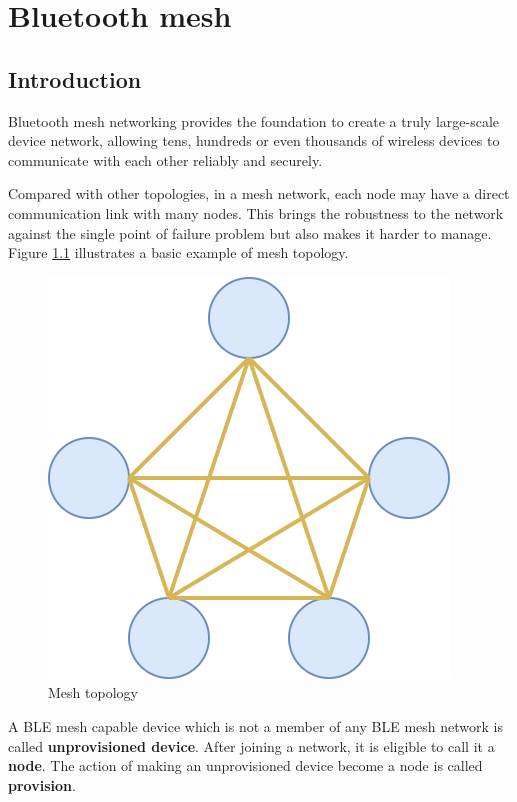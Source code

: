 \documentclass[../../main.tex]{subfiles}
\begin{document}
\graphicspath{{img/}{02_theory/img/}}

\chapter{Bluetooth mesh}

\section{Introduction}
Bluetooth mesh networking provides the foundation to create a truly large-scale device network, allowing tens, hundreds or even thousands of wireless devices to communicate with each other reliably and securely.

Compared with other topologies, in a mesh network, each node may have a direct communication link with many nodes. This brings the robustness to the network against the single point of failure problem but also makes it harder to manage. Figure \ref{fig:Mesh topology} illustrates a basic example of mesh topology.

\begin{figure}[ht]
    \begin{center}
        \includegraphics[scale=0.3]{mesh_topo.png}
    \end{center}
    \caption{Mesh topology}
    \label{fig:Mesh topology}
\end{figure}

A BLE mesh capable device which is not a member of any BLE mesh network is called \textbf{unprovisioned device}. After joining a  network, it is eligible to call it a \textbf{node}. The action of making an unprovisioned device become a node is called \textbf{provision}.
\end{document}
